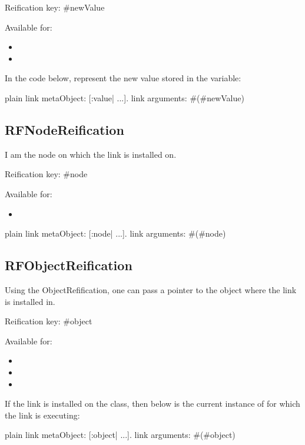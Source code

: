\documentclass[10pt,twoside,english]{_support/latex/sbabook/sbabook}
\begin{document}
Reification key: \#newValue

Available for:

\begin{itemize}
\item {}
\item {}
\end{itemize}

In the code below,  represent the new value stored in the variable:

\begin{displaycode}{plain}
link metaObject: [:value| ...].
link arguments: #(#newValue)
\end{displaycode}
\subsection{RFNodeReification}
I am the node on which the link is installed on.

Reification key: \#node

Available for:

\begin{itemize}
\item {}
\end{itemize}

\begin{displaycode}{plain}
link metaObject: [:node| ...].
link arguments: #(#node)
\end{displaycode}
\subsection{RFObjectReification}
Using the ObjectRefification, one can pass a pointer to the object where the link is installed in.

Reification key: \#object

Available for:

\begin{itemize}
\item {}
\item {}
\item {}
\end{itemize}

If the link is installed on the  class, then  below is the current instance of  for which the link is executing:

\begin{displaycode}{plain}
link metaObject: [:object| ...].
link arguments: #(#object)
\end{displaycode}
\end{document}
